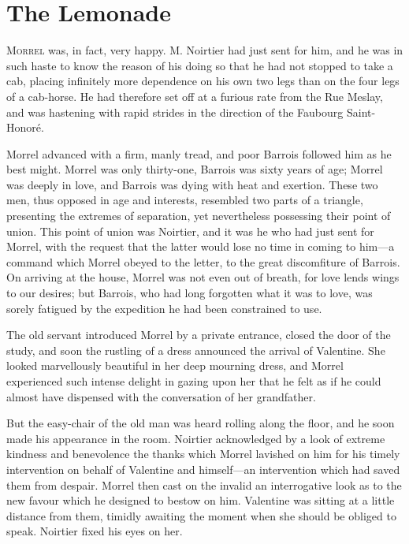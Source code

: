 \chapter{The Lemonade} 

 \lettrine{M}{orrel} was, in fact, very happy. M. Noirtier had just sent for him, and he was in such haste to know the reason of his doing so that he had not stopped to take a cab, placing infinitely more dependence on his own two legs than on the four legs of a cab-horse. He had therefore set off at a furious rate from the Rue Meslay, and was hastening with rapid strides in the direction of the Faubourg Saint-Honoré. 

 Morrel advanced with a firm, manly tread, and poor Barrois followed him as he best might. Morrel was only thirty-one, Barrois was sixty years of age; Morrel was deeply in love, and Barrois was dying with heat and exertion. These two men, thus opposed in age and interests, resembled two parts of a triangle, presenting the extremes of separation, yet nevertheless possessing their point of union. This point of union was Noirtier, and it was he who had just sent for Morrel, with the request that the latter would lose no time in coming to him—a command which Morrel obeyed to the letter, to the great discomfiture of Barrois. On arriving at the house, Morrel was not even out of breath, for love lends wings to our desires; but Barrois, who had long forgotten what it was to love, was sorely fatigued by the expedition he had been constrained to use. 

 The old servant introduced Morrel by a private entrance, closed the door of the study, and soon the rustling of a dress announced the arrival of Valentine. She looked marvellously beautiful in her deep mourning dress, and Morrel experienced such intense delight in gazing upon her that he felt as if he could almost have dispensed with the conversation of her grandfather. 

 But the easy-chair of the old man was heard rolling along the floor, and he soon made his appearance in the room. Noirtier acknowledged by a look of extreme kindness and benevolence the thanks which Morrel lavished on him for his timely intervention on behalf of Valentine and himself—an intervention which had saved them from despair. Morrel then cast on the invalid an interrogative look as to the new favour which he designed to bestow on him. Valentine was sitting at a little distance from them, timidly awaiting the moment when she should be obliged to speak. Noirtier fixed his eyes on her. 

